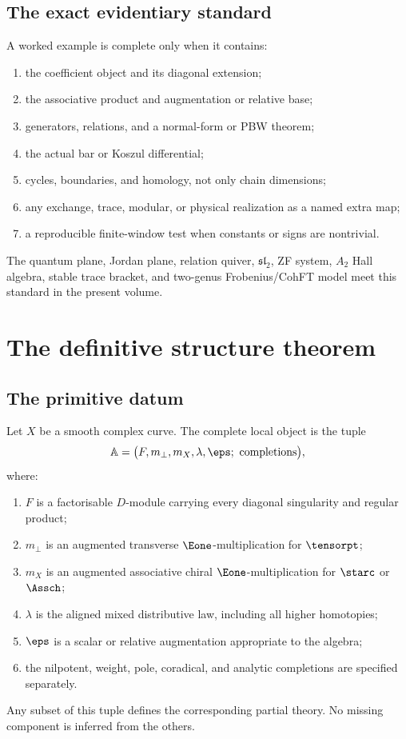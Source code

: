 \section{The exact evidentiary standard}
A worked example is complete only when it contains:
\begin{enumerate}
\item the coefficient object and its diagonal extension;
\item the associative product and augmentation or relative base;
\item generators, relations, and a normal-form or PBW theorem;
\item the actual bar or Koszul differential;
\item cycles, boundaries, and homology, not only chain dimensions;
\item any exchange, trace, modular, or physical realization as a named extra map;
\item a reproducible finite-window test when constants or signs are nontrivial.
\end{enumerate}
The quantum plane, Jordan plane, relation quiver, \(\mathfrak{sl}_2\), ZF system, \(A_2\) Hall algebra, stable trace bracket, and two-genus Frobenius/CohFT model meet this standard in the present volume.

\chapter{The definitive structure theorem}\label{chap:structure}

\section{The primitive datum}
Let \(X\) be a smooth complex curve.  The complete local object is the tuple
\[
 \mathbb A=
 \bigl(F,m_\perp,m_X,\lambda,\eps;\ \text{completions}\bigr),
\]
where:
\begin{enumerate}
\item \(F\) is a factorisable \(D\)-module carrying every diagonal singularity and regular product;
\item \(m_\perp\) is an augmented transverse \(\Eone\)-multiplication for \(\tensorpt\);
\item \(m_X\) is an augmented associative chiral \(\Eone\)-multiplication for \(\starc\) or \(\Assch\);
\item \(\lambda\) is the aligned mixed distributive law, including all higher homotopies;
\item \(\eps\) is a scalar or relative augmentation appropriate to the algebra;
\item the nilpotent, weight, pole, coradical, and analytic completions are specified separately.
\end{enumerate}
Any subset of this tuple defines the corresponding partial theory.  No missing component is inferred from the others.


